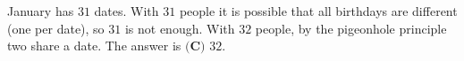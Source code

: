 January has $31$ dates. With $31$ people it is possible that all birthdays are different (one per date), so $31$ is not enough. With $32$ people, by the pigeonhole principle two share a date. The answer is $\boxed{\textbf{(C) }32}$.
